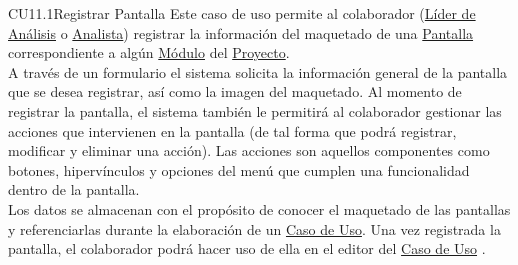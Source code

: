 	\begin{UseCase}{CU11.1}{Registrar Pantalla}{
		Este caso de uso permite al colaborador (\hyperlink{jefe}{Líder de Análisis} o \hyperlink{analista}{Analista}) registrar la información del maquetado de una \hyperlink{pantalla}{Pantalla} correspondiente a algún \hyperlink{moduloEntidad}{Módulo} del \hyperlink{proyectoEntidad}{Proyecto}.\\
		
		A través de un formulario el sistema solicita la información general de la pantalla que se desea registrar, así como la imagen del maquetado. Al momento de registrar la pantalla, el sistema también le permitirá al colaborador gestionar las acciones que intervienen en la pantalla (de tal forma que podrá registrar, modificar y eliminar una acción). Las acciones son aquellos componentes como botones, hipervínculos y opciones del menú que cumplen una funcionalidad dentro de la pantalla. \\
		
		Los datos se almacenan con el propósito de conocer el maquetado de las pantallas y referenciarlas durante la elaboración de un \hyperlink{casoUso}{Caso de Uso}. Una vez registrada la pantalla, el colaborador podrá hacer uso de ella en el editor del \hyperlink{casoUso}{Caso de Uso} .
	}
		

\end{UseCase}
